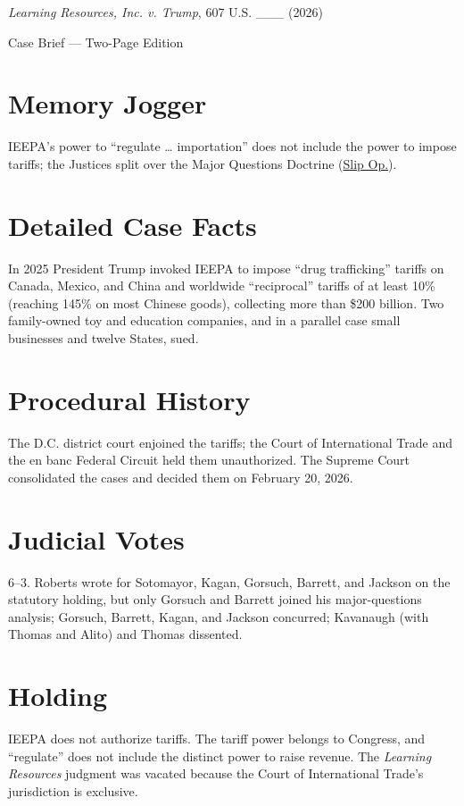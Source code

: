 \documentclass[12pt]{article}
\begin{document}
\begin{center}
{\LARGE \textit{Learning Resources, Inc. v. Trump}, 607 U.S. \_\_\_ (2026)\par}
\vspace{0.5em}
{\large Case Brief --- Two-Page Edition\par}
\end{center}

\section{Memory Jogger}
IEEPA's power to ``regulate \ldots{} importation'' does not include the power to impose tariffs; the Justices split over the Major Questions Doctrine (\href{https://www.supremecourt.gov/opinions/25pdf/24-1287_4gcj.pdf}{Slip Op.}).

\section{Detailed Case Facts}
In 2025 President Trump invoked IEEPA to impose ``drug trafficking'' tariffs on Canada, Mexico, and China and worldwide ``reciprocal'' tariffs of at least 10\% (reaching 145\% on most Chinese goods), collecting more than \$200 billion. Two family-owned toy and education companies, and in a parallel case small businesses and twelve States, sued.

\section{Procedural History}
The D.C. district court enjoined the tariffs; the Court of International Trade and the en banc Federal Circuit held them unauthorized. The Supreme Court consolidated the cases and decided them on February 20, 2026.

\section{Judicial Votes}
6--3. Roberts wrote for Sotomayor, Kagan, Gorsuch, Barrett, and Jackson on the statutory holding, but only Gorsuch and Barrett joined his major-questions analysis; Gorsuch, Barrett, Kagan, and Jackson concurred; Kavanaugh (with Thomas and Alito) and Thomas dissented.

\section{Holding}
IEEPA does not authorize tariffs. The tariff power belongs to Congress, and ``regulate'' does not include the distinct power to raise revenue. The \textit{Learning Resources} judgment was vacated because the Court of International Trade's jurisdiction is exclusive.
\end{document}
